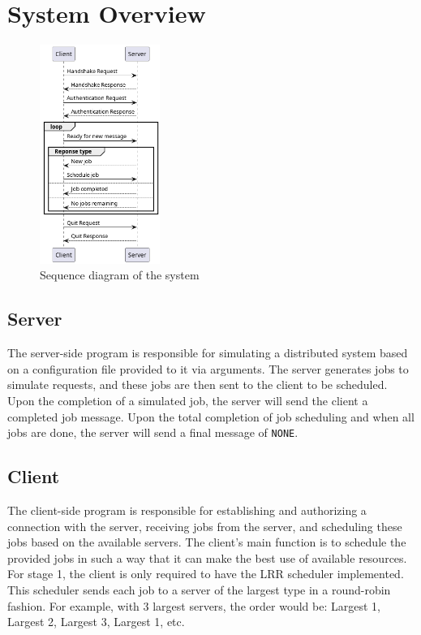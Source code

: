 \documentclass[a4paper]{article} %
\begin{document}
\section{System Overview}

\begin{figure}
	\centering
	\includegraphics[width=0.35\textwidth]{sequence}
	\caption{Sequence diagram of the system}
\end{figure}

\sloppy
\subsection{Server}
The server-side program is responsible for simulating a distributed system based on a configuration file provided to it via arguments. The server generates jobs to simulate requests, and these jobs are then sent to the client to be scheduled. Upon the completion of a simulated job, the server will send the client a completed job message. Upon the total completion of job scheduling and when all jobs are done, the server will send a final message of \texttt{NONE}.

\subsection{Client}
\sloppy
The client-side program is responsible for establishing and authorizing a connection with the server, receiving jobs from the server, and scheduling these jobs based on the available servers. The client's main function is to schedule the provided jobs in such a way that it can make the best use of available resources. For stage 1, the client is only required to have the LRR scheduler implemented. This scheduler sends each job to a server of the largest type in a round-robin fashion. For example, with 3 largest servers, the order would be: Largest 1, Largest 2, Largest 3, Largest 1, etc.
\vfil \break
\end{document}
